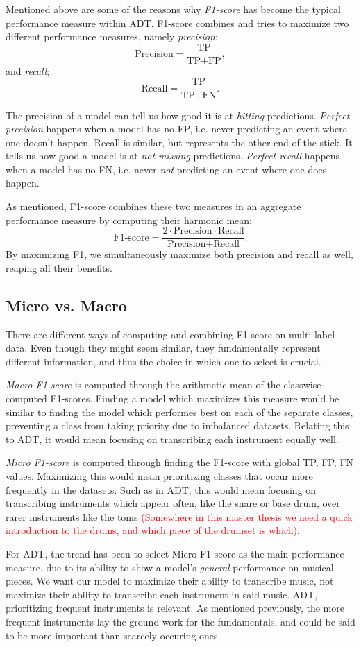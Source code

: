 Mentioned above are some of the reasons why \textit{F1-score} has become the typical performance measure within \gls{ADT}. F1-score combines and tries to maximize two different performance measures, namely \textit{precision}; $$ \text{Precision} = \frac{\text{TP}}{\text{TP} + \text{FP}}, $$ and \textit{recall}; $$ \text{Recall} = \frac{\text{TP}}{\text{TP} + \text{FN}}. $$

The precision of a model can tell us how good it is at \textit{hitting} predictions. \textit{Perfect precision} happens when a model has no \gls{FP}, i.e. never predicting an event where one doesn't happen. Recall is similar, but represents the other end of the stick. It tells us how good a model is at \textit{not missing} predictions. \textit{Perfect recall} happens when a model has no \gls{FN}, i.e. never \textit{not} predicting an event where one does happen.

As mentioned, F1-score combines these two measures in an aggregate performance measure by computing their harmonic mean: $$ \text{F1-score} = \frac{2 \cdot \text{Precision} \cdot \text{Recall}}{\text{Precision} + \text{Recall}}. $$ By maximizing F1, we simultaneously maximize both precision and recall as well, reaping all their benefits.

\subsection{Micro vs. Macro}

There are different ways of computing and combining F1-score on multi-label data. Even though they might seem similar, they fundamentally represent different information, and thus the choice in which one to select is crucial.

\textit{Macro F1-score} is computed through the arithmetic mean of the classwise computed F1-scores. Finding a model which maximizes this measure would be similar to finding the model which performes best on each of the separate classes, preventing a class from taking priority due to imbalanced datasets. Relating this to \gls{ADT}, it would mean focusing on transcribing each instrument equally well.

\textit{Micro F1-score} is computed through finding the F1-score with global \gls{TP}, \gls{FP}, \gls{FN} values. Maximizing this would mean prioritizing classes that occur more frequently in the datasets. Such as in \gls{ADT}, this would mean focusing on transcribing instruments which appear often, like the snare or base drum, over rarer instruments like the toms \textcolor{red}{(Somewhere in this master thesis we need a quick introduction to the drums, and which piece of the drumset is which)}. 

For \gls{ADT}, the trend has been to select Micro F1-score as the main performance measure, due to its ability to show a model's \textit{general} performance on musical pieces. We want our model to maximize their ability to transcribe music, not maximize their ability to transcribe each instrument in said music. \gls{ADT}, prioritizing frequent instruments is relevant. As mentioned previously, the more frequent instruments lay the ground work for the fundamentals, and could be said to be more important than scarcely occuring ones.